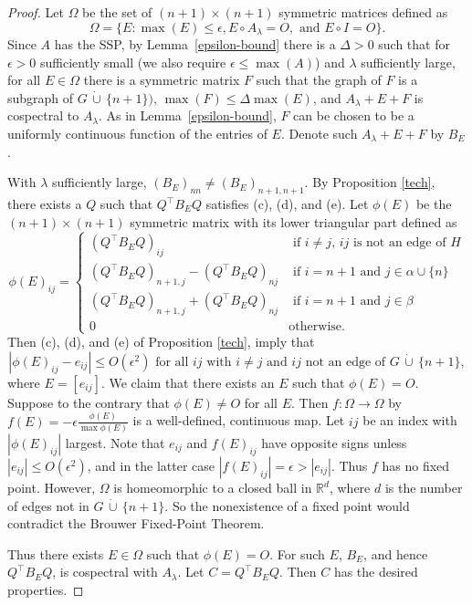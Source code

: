 \documentclass[11pt]{article}
\theoremstyle{definition}
\theoremstyle{definition}
\theoremstyle{definition}
\newcommand{\dcup}{\,\dot{\cup}\,}
\newcommand{\lam}{\lambda}
\def\trans{^{\top}}
\begin{document}
\begin{proof}
  Let $\Omega$ be the set of $(n+1)\times (n+1)$ symmetric matrices defined as 
\[\Omega= \{E: \max(E)\leq \epsilon, E \circ A_{\lambda}=O,\text{ and }E \circ I=O\}. \]
 Since $A$ has the SSP, by Lemma~\ref{epsilon-bound}  there is  
 a $\Delta>0$ such that for $\epsilon>0$ sufficiently small (we also require $\epsilon\leq \max(A)$) and $\lam$ sufficiently large,  for all $E\in \Omega$   there is a symmetric matrix $F$ such that the graph of $F$ is a subgraph of $G\dcup \{n+1\})$,  $\max(F) \leq \Delta \max(E)$, and $A_{\lambda} +E +F$  is cospectral to $A_{\lambda}$.  As in Lemma~\ref{epsilon-bound}, $F$ can be chosen to be a uniformly continuous function of the entries of $E$.  Denote such $A_{\lambda} +E+F$ by $B_{E}$.
 
With $\lam$ sufficiently large,  $(B_E)_{nn}\ne (B_E)_{n+1,n+1}$.  By Proposition \ref{tech}, there exists a $Q$ such that $Q\trans B_{E} Q$ satisfies (c), (d), and (e).
 Let $\phi(E)$ be the $(n+1) \times (n+1)$ symmetric matrix with its lower triangular part defined as 
 \[
 \phi(E)_{ij} {=} \left\{ \begin{array}{cl} (Q\trans B_{E}Q)_{ij} & \mbox{ if $i\neq j$, $ij$ is not an edge of $H$}\\
 (Q\trans B_{E}Q)_{n+1,j}-(Q\trans B_EQ)_{nj}& \mbox{ if $i=n+1$ and $j \in \alpha\cup\{n\}$} \\
 (Q\trans B_{E}Q)_{n+1,j}+(Q\trans B_EQ)_{nj}& \mbox{ if $i=n+1$ and $j \in \beta$} \\
 0 & \mbox{otherwise.} 
\end{array} \right.
\] 
 Then (c), (d), and (e) of Proposition \ref{tech}, imply that 
 \[ 
 |\phi(E)_{ij} -e_{ij}| \leq O( \epsilon^2) \mbox{ for all $ij$ with $i\neq j$ and $ij$ not an edge of $G \dcup \{ n+1 \}$},
 \]
 where $E=[e_{ij}]$.
We claim that there exists an $E$ such that $\phi (E) = O$.
Suppose to the contrary that $\phi(E)\neq O$ for all $E$.
Then $f: \Omega \rightarrow \Omega$ by 
$f(E)= -\epsilon \frac{\phi(E)}{\max \phi (E)}$
is a well-defined, continuous map. Let $ij$ be an index with $|\phi(E)_{ij}|$ largest.
Note that  $e_{ij}$ and $f(E)_{ij}$ have opposite signs unless $|e_{ij} | \leq O(\epsilon^2)$, and 
in the latter case $| f(E)_{ij}|= \epsilon > |e_{ij}|$.  Thus $f$ has no fixed point.
However, $\Omega$ is homeomorphic to a closed ball in $\mathbb{R}^d$, where $d$ is the number of edges 
not in $G\dcup \{ n+1\}$.  So the nonexistence of a fixed point would contradict the Brouwer Fixed-Point Theorem.

Thus there exists $E \in \Omega$ such that $\phi(E)=O$.  For such $E$, 
$B_E$, and hence $Q\trans B_{E}Q$, is cospectral with $A_{\lambda}$.  Let $C=Q\trans B_{E}Q$.  Then $C$ has the desired properties.

\end{proof}
\end{document}
